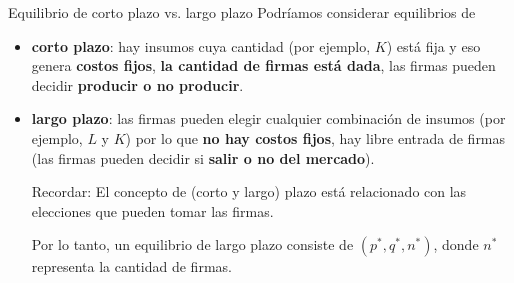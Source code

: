 \documentclass{beamer}
\begin{document}
\begin{frame}{Equilibrio de corto plazo vs. largo plazo}
    Podríamos considerar equilibrios de \begin{itemize}
        \item \textbf{corto plazo}: hay insumos cuya cantidad (por ejemplo, $K$) está fija y eso genera \textbf{costos fijos}, \textbf{la cantidad de firmas está dada}, las firmas pueden decidir \textbf{producir o no producir}.
        \item \textbf{largo plazo}:  las firmas pueden elegir cualquier combinación de insumos (por ejemplo, $L$ y $K$) por lo que \textbf{no hay costos fijos}, hay libre entrada de firmas (las firmas pueden decidir si \textbf{salir o no del mercado}).
        
        \begin{block}{Recordar:}
 El concepto de (corto y largo) plazo está relacionado con las elecciones que pueden tomar las firmas.

Por lo tanto, un equilibrio de largo plazo consiste de $(p^*,q^*,n^*)$, donde $n^*$ representa la cantidad de firmas.
        \end{block}
    \end{itemize}
\end{frame}
\end{document}
